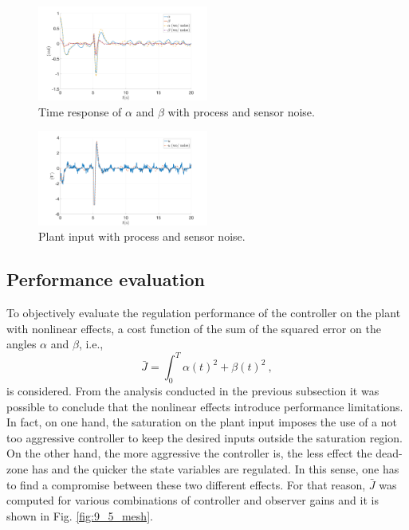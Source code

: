 \documentclass[letterpaper, 10 pt, conference]{ieeeconf}
\begin{document}
\begin{figure}[h]
    \centering
    \includegraphics[width = 0.5\textwidth]{figures/9_4_angles.png}
    \caption{Time response of $\alpha$ and $\beta$ with process and sensor noise.}
    \label{fig:9_4_angles}
\end{figure}
\begin{figure}[h]
    \centering
    \includegraphics[width = 0.5\textwidth]{figures/9_4_u.png}
    \caption{Plant input with process and sensor noise.}
    \label{fig:9_4_u}
\end{figure}

\subsection{Performance evaluation}\label{sec:optPer}
To objectively evaluate the regulation performance of the controller on the plant with nonlinear effects, a cost function of the sum of the squared error on the angles $\alpha$ and $\beta$, i.e.,
\begin{equation*}
    \bar{J} = \int_0^T \alpha(t)^2+\beta(t)^2\:,
\end{equation*}
is considered. From the analysis conducted in the previous subsection it was possible to conclude that the nonlinear effects introduce performance limitations. In fact, on one hand, the saturation on the plant input imposes the use of a not too aggressive controller to keep the desired inputs outside the saturation region. On the other hand, the more aggressive the controller is, the less effect the dead-zone has and the quicker the state variables are regulated. In this sense, one has to find a compromise between these two different effects. For that reason, $\bar{J}$ was computed for various combinations of controller and observer gains and it is shown in Fig. \ref{fig:9_5_mesh}. 
\end{document}
